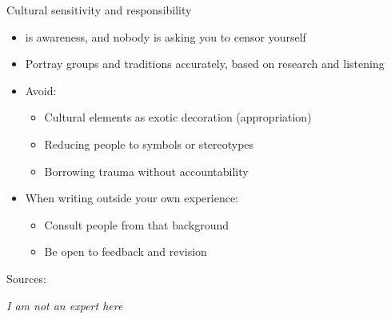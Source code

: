 \documentclass[aspectratio=169]{beamer}
\begin{document}
\begin{frame}{Cultural sensitivity and responsibility}
\begin{itemize}
  \item {} is awareness, and nobody is asking you to censor yourself
  \item Portray groups and traditions accurately, based on research and listening
  \item Avoid:
    \begin{itemize}
      \item Cultural elements as exotic decoration (appropriation)
      \item Reducing people to symbols or stereotypes
      \item Borrowing trauma without accountability
    \end{itemize}
  \item When writing outside your own experience:
    \begin{itemize}
      \item Consult people from that background
      \item Be open to feedback and revision
    \end{itemize}
\end{itemize}
\medskip
\small Sources: \citep{ocallaghan2025culturalsensitivity, wood2009ethicsfiction, hachette2021guidediversity}

\begin{center}
\emph{I am not an expert here}
\end{center}

\end{frame}



\end{document}
